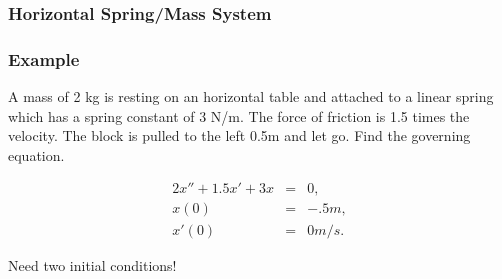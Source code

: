 \begin{frame}
  \frametitle{Horizontal Spring/Mass System}



\end{frame}


\begin{frame}
  \frametitle{Example}

  A mass of 2 kg is resting on an horizontal table and attached to a
  linear spring which has a spring constant of 3 N/m. The force of
  friction is 1.5 times the velocity. The block is pulled to the left
  0.5m and let go. Find the governing equation.

  {
    \begin{eqnarray*}
      2 x'' + 1.5 x' + 3x & = & 0, \\
      x(0) & = & -.5m, \\
      x'(0) & = & 0 m/s.
    \end{eqnarray*}

    Need two initial conditions!
  }

\end{frame}


